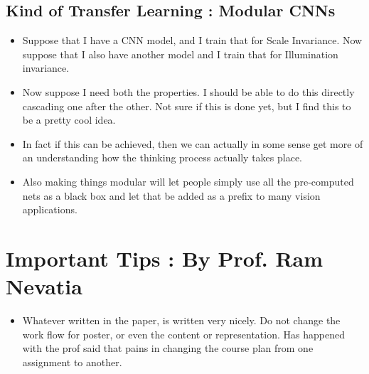 \documentclass{article}
\begin{document}
\subsection{Kind of Transfer Learning : Modular CNNs}
\begin{itemize}
\item Suppose that I have a CNN model, and I train that for Scale Invariance. Now suppose that I also have another model and I train that for Illumination invariance.
\item Now suppose I need both the properties. I should be able to do this directly cascading one after the other. Not sure if this is done yet, but I find this to be a pretty cool idea.
\item In fact if this can be achieved, then we can actually in some sense get more of an understanding how the thinking process actually takes place.
\item Also making things modular will let people simply use all the pre-computed nets as a black box and let that be added as a prefix to many vision applications.
\end{itemize}
\section{Important Tips : By Prof. Ram Nevatia}
\begin{itemize}
\item Whatever written in the paper, is written very nicely. Do not change the work flow for poster, or even the content or representation. Has happened with the prof said that pains in changing the course plan from one assignment to another.
\end{itemize}
\end{document}
